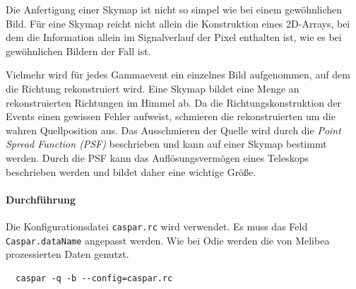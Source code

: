 Die Anfertigung einer Skymap ist nicht so simpel wie bei einem gewöhnlichen
Bild.
Für eine Skymap reicht nicht allein die Konstruktion eines 2D-Arrays,
bei dem die Information allein im Signalverlauf der Pixel enthalten ist,
wie es bei gewöhnlichen Bildern der Fall ist.

Vielmehr wird für jedes Gammaevent ein einzelnes Bild aufgenommen,
auf dem die Richtung rekonstruiert wird.
Eine Skymap bildet eine Menge an rekonstruierten Richtungen im Himmel ab.
Da die Richtungskonstruktion der Events einen gewissen Fehler aufweist,
schmieren die rekonstruierten um die wahren Quellposition aus.
Das Ausschmieren der Quelle wird durch die \textit{Point Spread Function (PSF)}
beschrieben
und kann auf einer Skymap bestimmt werden.
Durch die PSF kann das Auflösungsvermögen eines Teleskops
beschrieben werden und bildet daher eine wichtige Größe.

\paragraph{Durchführung}%

Die Konfigurationsdatei \texttt{caspar.rc} wird verwendet.
Es muss das Feld \texttt{Caspar.dataName} angepasst werden.
Wie bei Odie werden die von Melibea prozessierten Daten genutzt.


\begin{lstlisting}
  caspar -q -b --config=caspar.rc
\end{lstlisting}
